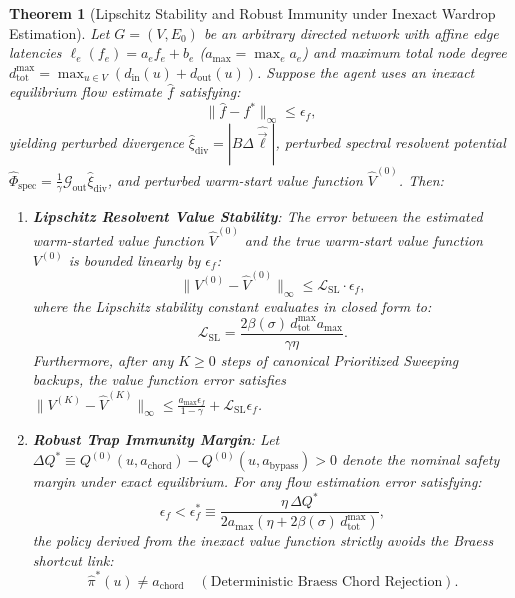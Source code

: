 \documentclass[11pt,a4paper]{article}
\newtheorem{theorem}{Theorem}
\begin{document}
\begin{theorem}[Lipschitz Stability and Robust Immunity under Inexact Wardrop Estimation]
\label{thm:lipschitz_stability}
Let $G = (V, E_0)$ be an arbitrary directed network with affine edge latencies $\ell_e(f_e) = a_e f_e + b_e$ ($a_{\max} = \max_e a_e$) and maximum total node degree $d_{\text{tot}}^{\max} = \max_{u \in V} (d_{\text{in}}(u) + d_{\text{out}}(u))$. Suppose the agent uses an inexact equilibrium flow estimate $\hat{f}$ satisfying:
\begin{equation}
\label{eq:flow_estimation_error}
\|\hat{f} - f^*\|_\infty \le \epsilon_f,
\end{equation}
yielding perturbed divergence $\hat{\xi}_{\text{div}} = |B \Delta \hat{\vec{\ell}}|$, perturbed spectral resolvent potential $\hat{\Phi}_{\text{spec}} = \frac{1}{\gamma} \mathcal{G}_{\text{out}} \hat{\xi}_{\text{div}}$, and perturbed warm-start value function $\hat{V}^{(0)}$. Then:
\begin{enumerate}
    \item \textbf{Lipschitz Resolvent Value Stability}: The error between the estimated warm-started value function $\hat{V}^{(0)}$ and the true warm-start value function $V^{(0)}$ is bounded linearly by $\epsilon_f$:
    \begin{equation}
    \label{eq:lipschitz_fixed_point_bound}
    \|V^{(0)} - \hat{V}^{(0)}\|_\infty \le \mathcal{L}_{\text{SL}} \cdot \epsilon_f,
    \end{equation}
    where the Lipschitz stability constant evaluates in closed form to:
    \begin{equation}
    \label{eq:lipschitz_constant}
    \mathcal{L}_{\text{SL}} = \frac{2 \beta(\sigma) \, d_{\text{tot}}^{\max} a_{\max}}{\gamma \eta}.
    \end{equation}
    Furthermore, after any $K \ge 0$ steps of canonical Prioritized Sweeping backups, the value function error satisfies $\|V^{(K)} - \hat{V}^{(K)}\|_\infty \le \frac{a_{\max}\epsilon_f}{1-\gamma} + \mathcal{L}_{\text{SL}} \epsilon_f$.
    
    \item \textbf{Robust Trap Immunity Margin}: Let $\Delta Q^* \equiv Q^{(0)}(u, a_{\text{chord}}) - Q^{(0)}(u, a_{\text{bypass}}) > 0$ denote the nominal safety margin under exact equilibrium. For any flow estimation error satisfying:
    \begin{equation}
    \label{eq:robust_error_radius}
    \epsilon_f < \epsilon_f^* \equiv \frac{\eta \, \Delta Q^*}{2 a_{\max} \left( \eta + 2 \beta(\sigma) \, d_{\text{tot}}^{\max} \right)},
    \end{equation}
    the policy derived from the inexact value function strictly avoids the Braess shortcut link:
    \begin{equation}
    \hat{\pi}^*(u) \ne a_{\text{chord}} \quad (\text{Deterministic Braess Chord Rejection}).
    \end{equation}
\end{enumerate}
\end{theorem}
\end{document}

